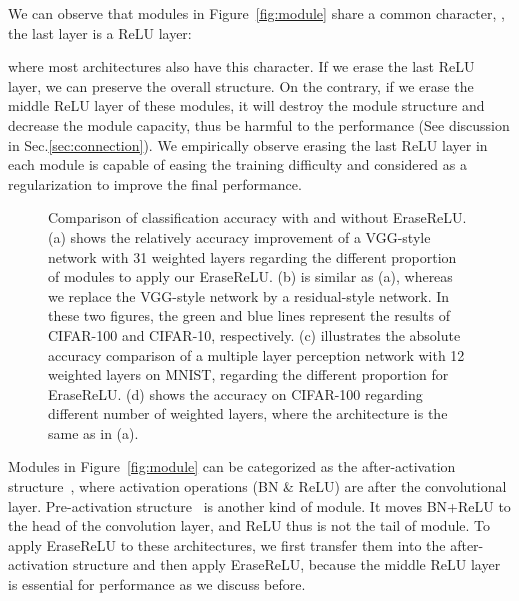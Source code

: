 \documentclass[10pt,twocolumn,letterpaper]{article}
\begin{document}
We can observe that modules in Figure~\ref{fig:module} share a common character, \ie, the last layer is a ReLU layer:

\vspace{-3mm}
{\small

}
\vspace{-3mm}

\noindent where most architectures also have this character. If we erase the last ReLU layer, we can preserve the overall structure.
On the contrary, if we erase the middle ReLU layer of these modules, it will destroy the module structure and decrease the module capacity, thus be harmful to the performance (See discussion in Sec.\ref{sec:connection}).
We empirically observe erasing the last ReLU layer in each module is capable of easing the training difficulty and considered as a regularization to improve the final performance.


\begin{figure}[!t]
\center
{}
\caption{Comparison of classification accuracy with and without EraseReLU.
(a) shows the relatively accuracy improvement of a VGG-style network with 31 weighted layers regarding the different proportion of modules to apply our EraseReLU.
(b) is similar as (a), whereas we replace the VGG-style network by a residual-style network.
In these two figures, the green and blue lines represent the results of CIFAR-100 and CIFAR-10, respectively.
(c) illustrates the absolute accuracy comparison of a multiple layer perception network with 12 weighted layers on MNIST, regarding the different proportion for EraseReLU.
(d) shows the accuracy on CIFAR-100 regarding different number of weighted layers, where the architecture is the same as in (a).
}
\label{fig:relu_ratio}
\end{figure}


Modules in Figure~\ref{fig:module} can be categorized as the after-activation structure~\cite{he2016identity}, where activation operations (BN \& ReLU) are after the convolutional layer.
Pre-activation structure~\cite{he2016identity,huang2017densely,zagoruyko2016wide} is another kind of module.
It moves BN+ReLU to the head of the convolution layer, and ReLU thus is not the tail of module.
To apply EraseReLU to these architectures, we first transfer them into the after-activation structure and then apply EraseReLU,
because the middle ReLU layer is essential for performance as we discuss before.
\end{document}
